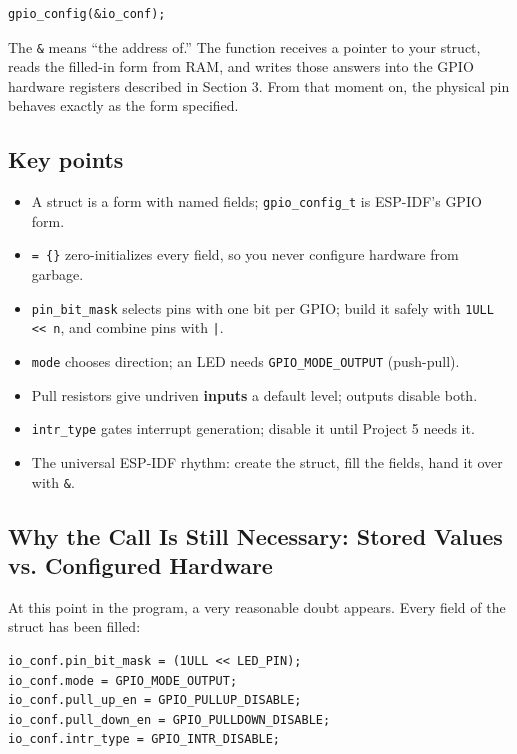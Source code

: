 \documentclass[11pt]{article}
\begin{document}
\begin{verbatim}
gpio_config(&io_conf);
\end{verbatim}

The \texttt{\&} means ``the address of.'' The function receives a pointer to your struct, reads the filled-in form from RAM, and writes those answers into the GPIO hardware registers described in Section 3. From that moment on, the physical pin behaves exactly as the form specified.

\subsection{Key points}

\begin{itemize}
    \item A struct is a form with named fields; \texttt{gpio\_config\_t} is ESP-IDF's GPIO form.
    \item \texttt{= \{\}} zero-initializes every field, so you never configure hardware from garbage.
    \item \texttt{pin\_bit\_mask} selects pins with one bit per GPIO; build it safely with \texttt{1ULL << n}, and combine pins with \texttt{|}.
    \item \texttt{mode} chooses direction; an LED needs \texttt{GPIO\_MODE\_OUTPUT} (push-pull).
    \item Pull resistors give undriven \textbf{inputs} a default level; outputs disable both.
    \item \texttt{intr\_type} gates interrupt generation; disable it until Project 5 needs it.
    \item The universal ESP-IDF rhythm: create the struct, fill the fields, hand it over with \texttt{\&}.
\end{itemize}

\subsection{Why the Call Is Still Necessary: Stored Values vs. Configured Hardware}

At this point in the program, a very reasonable doubt appears. Every field of the struct has been filled:

\begin{verbatim}
io_conf.pin_bit_mask = (1ULL << LED_PIN);
io_conf.mode = GPIO_MODE_OUTPUT;
io_conf.pull_up_en = GPIO_PULLUP_DISABLE;
io_conf.pull_down_en = GPIO_PULLDOWN_DISABLE;
io_conf.intr_type = GPIO_INTR_DISABLE;
\end{verbatim}
\end{document}
